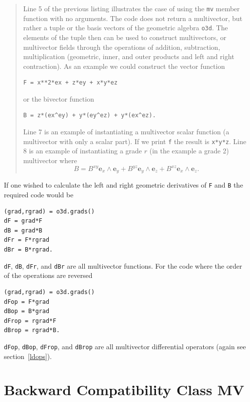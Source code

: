 \documentclass[12pt]{report}
\newcommand{\bm}[1]{\boldsymbol{#1}}
\newcommand{\W}{\wedge}
\newcommand{\T}[1]{\texttt{#1}}
\begin{document}
\begin{quote}
Line 5 of the previous listing illustrates the case of using the \T{mv} member function with
no arguments. The code does not return a multivector, but rather a tuple or the basis vectors of the geometric algebra \T{o3d}.
The elements of the tuple then can
be used to construct multivectors, or multivector fields through the operations
of addition, subtraction, multiplication (geometric, inner, and outer products and left and right contraction).
As an example we could construct the vector function
\begin{lstlisting}[numbers=none]
F = x**2*ex + z*ey + x*y*ez
\end{lstlisting}
\vspace{-12pt}or the bivector function
\begin{lstlisting}[numbers=none]
B = z*(ex^ey) + y*(ey^ez) + y*(ex^ez).
\end{lstlisting}
\vspace{-7pt}Line 7 is an example of instantiating a multivector scalar function (a multivector with only a scalar part). If
we print \T{f} the result is \T{x*y*z}.  Line 8 is an example of instantiating a grade $r$ (in the example a grade 2) multivector
where
\begin{equation}
    B = B^{xy}\bm{e}_{x}\W\bm{e}_{y}+B^{yz}\bm{e}_{y}\W\bm{e}_{z}+B^{xz}\bm{e}_{x}\W\bm{e}_{z}.
\end{equation}
\end{quote}
If one wished to calculate the left and right geometric derivatives of \T{F} and \T{B} the required code would be
\begin{lstlisting}
(grad,rgrad) = o3d.grads()
dF = grad*F
dB = grad*B
dFr = F*rgrad
dBr = B*rgrad.
\end{lstlisting}
\T{dF}, \T{dB}, \T{dFr}, and \T{dBr} are all multivector functions. For the code where the order of the operations are
reversed
\begin{lstlisting}
(grad,rgrad) = o3d.grads()
dFop = F*grad
dBop = B*grad
dFrop = rgrad*F
dBrop = rgrad*B.
\end{lstlisting}
\T{dFop}, \T{dBop}, \T{dFrop}, and \T{dBrop} are all multivector differential operators (again see section~\ref{ldops}).

\section{Backward Compatibility Class MV}
\end{document}
